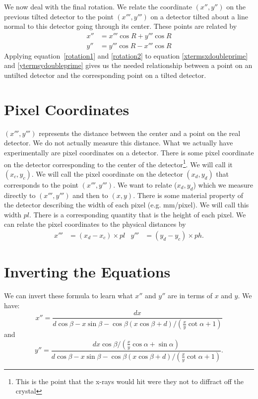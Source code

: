 We now deal with the final rotation. We relate
the coordinate $(x'',y'')$ on the previous tilted 
detector to the point $(x''',y''')$ on a detector 
tilted about a line normal to this detector going 
through its center. These points are related by
\begin{align}
    x''&=x'''\cos R + y'''\cos R\label{rotation1}\\
    y''&=y'''\cos R - x'''\cos R\label{rotation2}
\end{align}
Applying equation~\ref{rotation1} and \ref{rotation2}
to equation \ref{xtermsxdoubleprime} and \ref{ytermsydoubleprime}
gives us the needed relationship between a point on an untilted
detector and the corresponding point on a tilted detector.

\section{Pixel Coordinates}

$(x''',y''')$ represents the distance between the center 
and a point on the real detector. We do not actually
measure this distance. What we actually have experimentally
are pixel coordinates on a detector. There is some pixel 
coordinate on the detector corresponding to the center of
the detector\footnote{This is the point that the x-rays would
hit were they not to diffract off the crystal}. We will call 
it $(x_c,y_c)$.  We will call the pixel coordinate on the detector
$(x_d,y_d)$ that corresponds to the point $(x''',y''')$.
We want to relate ($x_d,y_d$) which we measure directly
to $(x''',y''')$ and then to $(x,y)$.
There is some material property of the detector 
describing the width of each pixel
(e.g. \unit[1000]{mm/pixel}). We will call
this width $pl$. There is a corresponding
quantity that is the height of each pixel.
We can relate the pixel coordinates to the physical distances
by
\begin{align}\label{conversionToPixels}
    x'''&=(x_d-x_c) \times pl &
    y'''&=(y_d-y_c) \times ph.
\end{align}

\section{Inverting the Equations}

We can invert these formula to learn what
$x''$ and $y''$ are in terms of $x$ and $y$.
We have:
\begin{equation}\label{invertx}
    x''=\frac{dx}{d\cos\beta-x\sin\beta-
    \cos\beta(x\cos\beta+d)/(\tfrac{x}{y}\cot\alpha+1)}
\end{equation}
and
\begin{equation}\label{inverty}
    y''=\frac{dx\cos\beta/(\tfrac{x}{y}\cos\alpha+\sin\alpha)}
    {d\cos\beta-x\sin\beta-
    \cos\beta(x\cos\beta+d)/(\tfrac{x}{y}\cot\alpha+1)}.
\end{equation}

